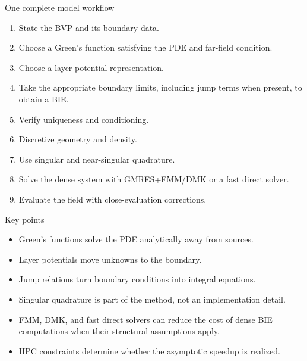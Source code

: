 \documentclass[aspectratio=169,11pt]{beamer}
\begin{document}
\begin{frame}{One complete model workflow}
\small
\begin{enumerate}
  \item State the BVP and its boundary data.
  \item Choose a Green's function satisfying the PDE and far-field condition.
  \item Choose a layer potential representation.
  \item Take the appropriate boundary limits, including jump terms when
  present, to obtain a BIE.
  \item Verify uniqueness and conditioning.
  \item Discretize geometry and density.
  \item Use singular and near-singular quadrature.
  \item Solve the dense system with GMRES+FMM/DMK or a fast direct solver.
  \item Evaluate the field with close-evaluation corrections.
\end{enumerate}
\end{frame}

\begin{frame}{Key points}
\small
\begin{itemize}
  \item Green's functions solve the PDE analytically away from sources.
  \item Layer potentials move unknowns to the boundary.
  \item Jump relations turn boundary conditions into integral equations.
  \item Singular quadrature is part of the method, not an implementation detail.
  \item FMM, DMK, and fast direct solvers can reduce the cost of dense BIE
  computations when their structural assumptions apply.
  \item HPC constraints determine whether the asymptotic speedup is realized.
\end{itemize}
\end{frame}
\end{document}

